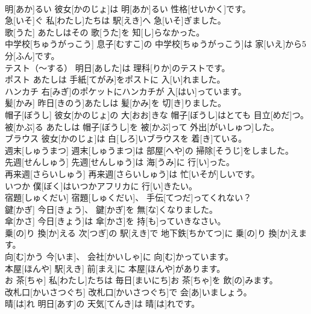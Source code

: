 \documentclass[8pt]{extreport}
\begin{document}
\begin{CJK}{UTF8}{min}
\\	明[あか]るい	彼女[かのじょ]は 明[あか]るい 性格[せいかく]です。		
\\	急[いそ]ぐ	私[わたし]たちは 駅[えき]へ 急[いそ]ぎました。		
\\	歌[うた]	あたしはその 歌[うた]を 知[し]らなかった。		
\\	中学校[ちゅうがっこう]	息子[むすこ]の 中学校[ちゅうがっこう]は 家[いえ]から5 分[ふん]です。		
\\	テスト（～する）	明日[あした]は 理科[りか]のテストです。		
\\	ポスト	あたしは 手紙[てがみ]をポストに 入[い]れました。		
\\	ハンカチ	右[みぎ]のポケットにハンカチが 入[はい]っています。		
\\	髪[かみ]	昨日[きのう]あたしは 髪[かみ]を 切[き]りました。		
\\	帽子[ぼうし]	彼女[かのじょ]の 大[おお]きな 帽子[ぼうし]はとても 目立[めだ]つ。		
\\	被[かぶ]る	あたしは 帽子[ぼうし]を 被[かぶ]って 外出[がいしゅつ]した。		
\\	ブラウス	彼女[かのじょ]は 白[しろ]いブラウスを 着[き]ている。		
\\	週末[しゅうまつ]	週末[しゅうまつ]は 部屋[へや]の 掃除[そうじ]をしました。		
\\	先週[せんしゅう]	先週[せんしゅう]は 海[うみ]に 行[い]った。		
\\	再来週[さらいしゅう]	再来週[さらいしゅう]は 忙[いそが]しいです。		
\\	いつか	僕[ぼく]はいつかアフリカに 行[い]きたい。		
\\	宿題[しゅくだい]	宿題[しゅくだい]、 手伝[てつだ]ってくれない？		
\\	鍵[かぎ]	今日[きょう]、 鍵[かぎ]を 無[な]くなりました。		
\\	傘[かさ]	今日[きょう]は 傘[かさ]を 持[も]っていきなさい。		
\\	乗[の]り 換[か]える	次[つぎ]の 駅[えき]で 地下鉄[ちかてつ]に 乗[の]り 換[か]えます。		
\\	向[む]かう	今[いま]、 会社[かいしゃ]に 向[む]かっています。		
\\	本屋[ほんや]	駅[えき] 前[まえ]に 本屋[ほんや]があります。		
\\	お 茶[ちゃ]	私[わたし]たちは 毎日[まいにち]お 茶[ちゃ]を 飲[の]みます。		
\\	改札口[かいさつぐち]	改札口[かいさつぐち]で 会[あ]いましょう。		
\\	晴[は]れ	明日[あす]の 天気[てんき]は 晴[は]れです。		

\end{CJK}
\end{document}

